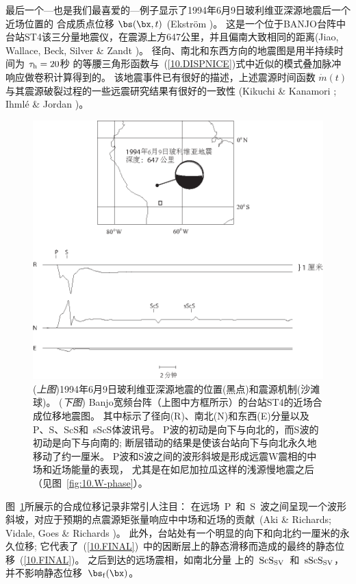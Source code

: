 最后一个---也是我们最喜爱的---例子显示了1994年6月9日玻利维亚深源地震后一个近场位置的
合成质点位移 $\bs(\bx,t)$ (Ekstr\"{o}m \citeyear{ekstrom95})。
%
这是一个位于BANJO台阵中台站ST4该三分量地震仪，在震源上方647公里，并且偏南大致相同的距离(Jiao, Wallace, Beck, Silver \& Zandt \citeyear{jiao&al95})。
径向、南北和东西方向的地震图是用半持续时间为 $\tau_{\rm h}=20$秒 的等腰三角形函数与~(\ref{10.DISPNICE})式中近似的模式叠加脉冲响应做卷积计算得到的。
该地震事件已有很好的描述，上述震源时间函数 $\dot{m}(t)$与其震源破裂过程的一些远震研究结果有很好的一致性
(Kikuchi \& Kanamori \citeyear{kikuchi&kanamori94};
Ihml\'{e} \& Jordan \citeyear{ihmle&jordan95})。
\begin{figure}[!t]
\begin{center}
\includegraphics{../figures/chap10/fig19.eps}
\end{center}
\caption[Bolivia near-field]{
\label{fig:10.20}
({\em 上图\/})1994年6月9日玻利维亚深源地震的位置(黑点)和震源机制(沙滩球)。 
({\em 下图\/}) Banjo宽频台阵（上图中方框所示）的台站ST4的近场合成位移地震图。
其中标示了径向(R)、南北(N)和东西(E)分量以及P、S、ScS和~sScS体波讯号。
P波的初动是向下与向北的，而S波的初动是向下与向南的;
断层错动的结果是使该台站向下与向北永久地移动了约一厘米。
P波和S波之间的波形斜坡是形成远震W震相的中场和近场能量的表现，
尤其是在如尼加拉瓜这样的浅源慢地震之后（见图~\ref{fig:10.W-phase}）。}
\end{figure}
%
%
图~\ref{fig:10.20}所展示的合成位移记录非常引人注目：
在远场~P~和~S~波之间呈现一个波形斜坡，对应于预期的点震源矩张量响应中中场和近场的贡献~(Aki \& Richards\citeyear{aki&richards80};
Vidale, Goes \& Richards \citeyear{vidale&al95})。
%
此外，台站处有一个明显的向下和向北约一厘米的永久位移;
它代表了~(\ref{10.FINAL})~中的因断层上的静态滑移而造成的最终的静态位移~(\ref{10.FINAL})。
%
%
%
%
%
之后到达的远场震相，如南北分量
上的~${\rm ScS}_{\rm SV}$~和~${\rm sScS}_{\rm SV}$，并不影响静态位移~$\bs_{\rm f}(\bx)$。

